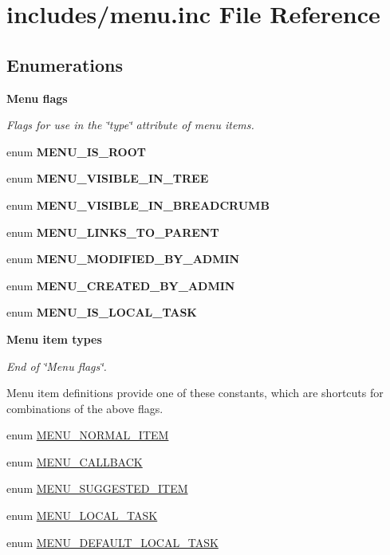 \hypertarget{menu_8inc}{
\section{includes/menu.inc File Reference}
\label{menu_8inc}
}
\subsection*{Enumerations}
\begin{Indent}{\bf Menu flags}\par
{\em Flags for use in the \char`\"{}type\char`\"{} attribute of menu items. }\begin{CompactItemize}
\item 
enum \textbf{MENU\_\-IS\_\-ROOT} 
\item 
enum \textbf{MENU\_\-VISIBLE\_\-IN\_\-TREE} 
\item 
enum \textbf{MENU\_\-VISIBLE\_\-IN\_\-BREADCRUMB} 
\item 
enum \textbf{MENU\_\-LINKS\_\-TO\_\-PARENT} 
\item 
enum \textbf{MENU\_\-MODIFIED\_\-BY\_\-ADMIN} 
\item 
enum \textbf{MENU\_\-CREATED\_\-BY\_\-ADMIN} 
\item 
enum \textbf{MENU\_\-IS\_\-LOCAL\_\-TASK} 
\end{CompactItemize}
\end{Indent}
\begin{Indent}{\bf Menu item types}\par
{\em End of \char`\"{}Menu flags\char`\"{}.

Menu item definitions provide one of these constants, which are shortcuts for combinations of the above flags. }\begin{CompactItemize}
\item 
enum \hyperlink{group__menu_gc42144282c42a943b05511b38c451e4c}{MENU\_\-NORMAL\_\-ITEM} 
\item 
enum \hyperlink{group__menu_g92850b428279a637ce9bac5c1757700f}{MENU\_\-CALLBACK} 
\item 
enum \hyperlink{group__menu_g0860a2534ce61dc1334dc7ede68e20b3}{MENU\_\-SUGGESTED\_\-ITEM} 
\item 
enum \hyperlink{group__menu_g4dc67226400f237bd3c0a5ef7126008b}{MENU\_\-LOCAL\_\-TASK} 
\item 
enum \hyperlink{group__menu_g251e324e062f2e4c703f51231c0d7dc5}{MENU\_\-DEFAULT\_\-LOCAL\_\-TASK} 
\end{CompactItemize}
\end{Indent}
